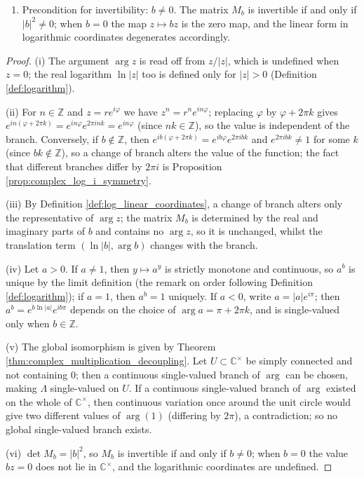 \begin{property}
\begin{enumerate}[label=(\roman*)]
    \item Precondition for invertibility: $b\neq0$. The matrix $M_b$ is invertible if and only if $|b|^2\neq0$; when $b=0$ the map $z\mapsto bz$ is the zero map, and the linear form in logarithmic coordinates degenerates accordingly.
\end{enumerate}
\end{property}

\begin{proof}
(i) The argument $\arg z$ is read off from $z/|z|$, which is undefined when $z=0$; the real logarithm $\ln|z|$ too is defined only for $|z|>0$ (Definition \ref{def:logarithm}).

(ii) For $n\in\mathbb{Z}$ and $z=re^{i\varphi}$ we have $z^n=r^ne^{in\varphi}$; replacing $\varphi$ by $\varphi+2\pi k$ gives $e^{in(\varphi+2\pi k)}=e^{in\varphi}e^{2\pi ink}=e^{in\varphi}$ (since $nk\in\mathbb{Z}$), so the value is independent of the branch. Conversely, if $b\notin\mathbb{Z}$, then $e^{ib(\varphi+2\pi k)}=e^{ib\varphi}e^{2\pi ibk}$ and $e^{2\pi ibk}\neq1$ for some $k$ (since $bk\notin\mathbb{Z}$), so a change of branch alters the value of the function; the fact that different branches differ by $2\pi i$ is Proposition \ref{prop:complex_log_i_symmetry}.

(iii) By Definition \ref{def:log_linear_coordinates}, a change of branch alters only the representative of $\arg z$; the matrix $M_b$ is determined by the real and imaginary parts of $b$ and contains no $\arg z$, so it is unchanged, whilst the translation term $(\ln|b|,\arg b)$ changes with the branch.

(iv) Let $a>0$. If $a\neq1$, then $y\mapsto a^y$ is strictly monotone and continuous, so $a^b$ is unique by the limit definition (the remark on order following Definition \ref{def:logarithm}); if $a=1$, then $a^b=1$ uniquely. If $a<0$, write $a=|a|e^{i\pi}$; then $a^b=e^{b\ln|a|}e^{ib\pi}$ depends on the choice of $\arg a=\pi+2\pi k$, and is single-valued only when $b\in\mathbb{Z}$.

(v) The global isomorphism is given by Theorem \ref{thm:complex_multiplication_decoupling}. Let $U\subset\mathbb{C}^{\times}$ be simply connected and not containing $0$; then a continuous single-valued branch of $\arg$ can be chosen, making $\Lambda$ single-valued on $U$. If a continuous single-valued branch of $\arg$ existed on the whole of $\mathbb{C}^{\times}$, then continuous variation once around the unit circle would give two different values of $\arg(1)$ (differing by $2\pi$), a contradiction; so no global single-valued branch exists.

(vi) $\det M_b=|b|^2$, so $M_b$ is invertible if and only if $b\neq0$; when $b=0$ the value $bz=0$ does not lie in $\mathbb{C}^{\times}$, and the logarithmic coordinates are undefined.
\end{proof}

